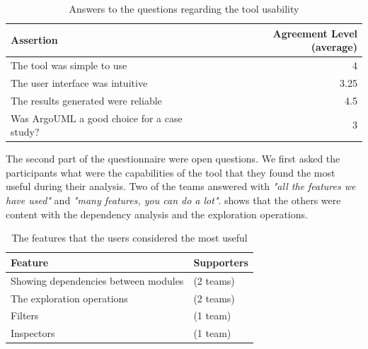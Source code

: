 \documentclass[preprint,12pt]{elsarticle}
\begin{document}
\begin{table}[ht]
\begin{center}
\begin{tabular}{p{8cm} r}
\footnotesize{Assertion} & \footnotesize{Agreement Level (average)} \\ \hline
\footnotesize{The tool was simple to use} & \footnotesize{4}  \\
\footnotesize{The user interface was intuitive} & \footnotesize{3.25} \\
\footnotesize{The results generated were reliable} & \footnotesize{4.5} \\
\footnotesize{Was ArgoUML a good choice for a case study?} & \footnotesize{3} \\ \hline
\end{tabular}
\caption{Answers to the questions regarding the tool usability }
\label{tab:postsurvey}
\end{center}
\end{table}

The second part of the questionnaire were open questions. We first asked the participants what were the capabilities of the tool that they found the most useful during their analysis. Two of the teams answered with {\em "all the features we have used"} and {\em "many features, you can do a lot"}.  shows that the others were content with the dependency analysis and the exploration operations.

\begin{table}[ht]
\begin{center}
\begin{tabular}{l l}
\footnotesize {Feature} &\footnotesize{ Supporters} \\
\hline
\footnotesize {Showing dependencies between modules} & \footnotesize{(2 teams)} \\
\footnotesize {The exploration operations} &\footnotesize{(2 teams)} \\
\footnotesize {Filters} &\footnotesize{(1 team)} \\
\footnotesize {Inspectors} &\footnotesize{(1 team)} \\
\hline
\end{tabular}
\caption{The features that the users considered the most useful}
\label{tab:useful}
\end{center}
\end{table}
\end{document}
